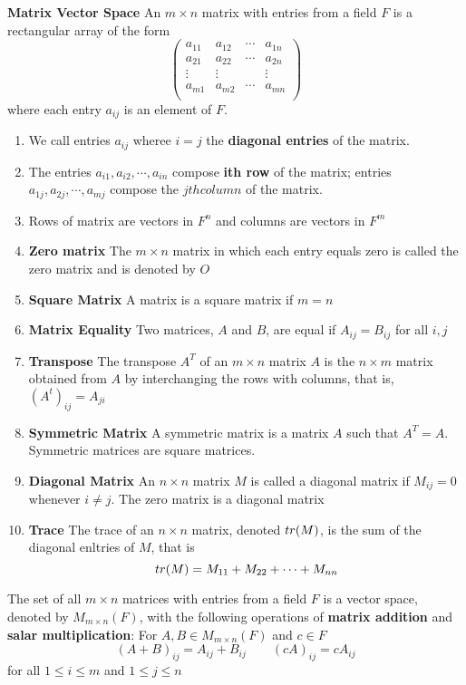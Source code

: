 \documentclass[11pt]{article}
\begin{document}
\begin{defn*}
    \textbf{Matrix Vector Space} An $m\times n$ matrix with entries from a field $F$ is a rectangular array of the form 
    \[
        \begin{pmatrix}
            a_{11} & a_{12} & \cdots & a_{1n} \\ 
            a_{21} & a_{22} & \cdots & a_{2n} \\ 
            \vdots & \vdots &  & \vdots \\ 
            a_{m1} & a_{m2} & \cdots & a_{mn} \\ 
        \end{pmatrix}    
    \]
    where each entry $a_{ij}$ is an element of $F$. 
    \begin{enumerate}
        \item We call entries $a_{ij}$ wheree $i=j$ the \textbf{diagonal entries}  of the matrix.
        \item The entries $a_{i1}, a_{i2}, \cdots, a_{in}$ compose \textbf{ith row} of the matrix; entries $a_{1j}, a_{2j}, \cdots, a_{mj}$ compose the $jth column$ of the matrix. 
        \item Rows of matrix are vectors in $F^n$ and columns are vectors in $F^m$
        \item \textbf{Zero matrix} The $m\times n$ matrix in which each entry equals zero is called the zero matrix and is denoted by $O$
        \item \textbf{Square Matrix} A matrix is a square matrix if $m=n$
        \item \textbf{Matrix Equality} Two matrices, $A$ and $B$, are equal if $A_{ij} = B_{ij}$ for all $i,j$
        \item \textbf{Transpose} The transpose $A^T$ of an $m\times n$ matrix $A$ is the $n\times m$ matrix obtained from $A$ by interchanging the rows with columns, that is, $(A^t)_{ij} = A_{ji}$
        \item \textbf{Symmetric Matrix} A symmetric matrix is a matrix $A$ such that $A^T = A$. Symmetric matrices are square matrices. 
        \item \textbf{Diagonal Matrix} An $n\times n$ matrix $M$ is called a diagonal matrix if $M_{ij}=0$ whenever $i\neq j$. The zero matrix is a diagonal matrix
        \item \textbf{Trace} The trace of an $n\times n$ matrix, denoted $tr(M)$, is the sum of the diagonal enltries of $M$, that is 
        \[
            tr(M) = M_{11} + M_{22} + \cdots + M_{nn}    
        \]
    \end{enumerate}
    The set of all $m\times n$ matrices with entries from a field $F$ is a vector space, denoted by $M_{m\times n}(F)$, with the following operations of \textbf{matrix addition} and \textbf{salar multiplication}: For $A,B\in M_{m\times n}(F)$ and $c\in F$
    \[
        (A+B)_{ij}=A_{ij}+B_{ij}
        \quad \quad
        (cA)_{ij} = cA_{ij}    
    \]
    for all $1\leq i \leq m$ and $1\leq j \leq n$ 
\end{defn*}
\end{document}
